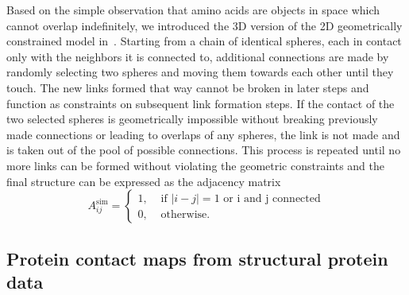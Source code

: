\documentclass[
reprint,
twocolumn,
amsmath,amssymb,superscriptaddress,aps,
pre]{revtex4-1}
\begin{document}
Based on the simple observation that amino acids are objects in space which cannot overlap indefinitely, we introduced the 3D version of the 2D geometrically constrained model in~\cite{molkenthin2020self}. Starting from a chain of identical spheres, each in contact only with the neighbors it is connected to, additional connections are made by randomly selecting two spheres and moving them towards each other until they touch. The new links formed that way cannot be broken in later steps and function as constraints on subsequent link formation steps. If the contact of the two selected spheres is geometrically impossible without breaking previously made connections or leading to overlaps of any spheres, the link is not made and is taken out of the pool of possible connections. This process is repeated until no more links can be formed without violating the geometric constraints and the final structure can be expressed as the adjacency matrix
\begin{equation}
  A^{\mathrm{sim}}_{ij}=
  \begin{cases}
   1, & \text{ if }|i-j|=1 \text{ or i and j connected} \\
      0, & \text{ otherwise}.
      \end{cases}
    \label{eq:sim_aij}
\end{equation}



\subsection{Protein contact maps from structural protein data}
\end{document}
